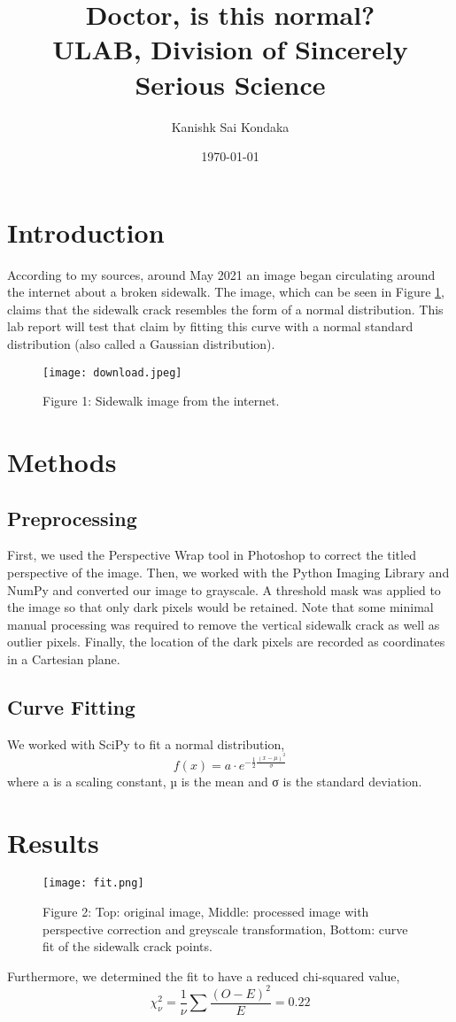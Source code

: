 \documentclass{article}
\title{Doctor, is this normal? \\ \large ULAB, Division of Sincerely Serious Science}
\author{Kanishk Sai Kondaka}
\date{\today}
\begin{document}
\maketitle

\section{Introduction}
According to my sources, around May 2021 an image began circulating around the internet about a broken sidewalk. The image, which can be seen in Figure \ref{fig:Figure 1}, claims that the sidewalk crack resembles the form of a normal distribution. This lab report will test that claim by fitting this curve with a normal standard
distribution (also called a Gaussian distribution).
\begin{figure}[h]
    \centering
    \texttt{[image: download.jpeg]}
    \caption{Figure 1: Sidewalk image from the internet.}
    \label{fig:Figure 1}
\end{figure}

\section{Methods}
\subsection{Preprocessing}
First, we used the Perspective Wrap tool in Photoshop to correct the titled perspective of the image. Then,
we worked with the Python Imaging Library and NumPy \cite{2020NumPy-Array} and converted our image to grayscale.
A threshold mask was applied to the image so that only dark pixels would be retained. Note that some
minimal manual processing was required to remove the vertical sidewalk crack as well as outlier pixels.
Finally, the location of the dark pixels are recorded as coordinates in a Cartesian plane.
\subsection{Curve Fitting}
We worked with SciPy \cite{2020SciPy-NMeth} to fit a normal distribution,
\begin{equation}
    f(x) = a \cdot e^{-\frac{1}{2} \frac{(x-\mu)^2}{\sigma}}
\end{equation}
where a is a scaling constant, µ is the mean and σ is the standard deviation.

\section{Results}
\begin{figure}[h]
    \centering
    \texttt{[image: fit.png]}
    \caption{Figure 2: Top: original image, Middle: processed image with perspective correction and greyscale transformation, Bottom: curve fit of the sidewalk crack points.}
    \label{fig:Figure 2}
\end{figure}
Furthermore, we determined the fit to have a reduced chi-squared value,
\begin{equation}
    \chi^2_\nu = \frac{1}{\nu}\sum\frac{(O-E)^2}{E} = 0.22
\end{equation}



\nocite{*}
\end{document}
